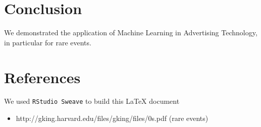 \documentclass[a4paper]{article}
\begin{document}
\section*{Conclusion}

We demonstrated the application of Machine Learning in Advertising Technology, in particular for rare events.


\section*{References}
We used \texttt{RStudio Sweave} to build this \LaTeX{} document
\begin{itemize}
  \item http://gking.harvard.edu/files/gking/files/0s.pdf (rare events)
\end{itemize}
\end{document}
